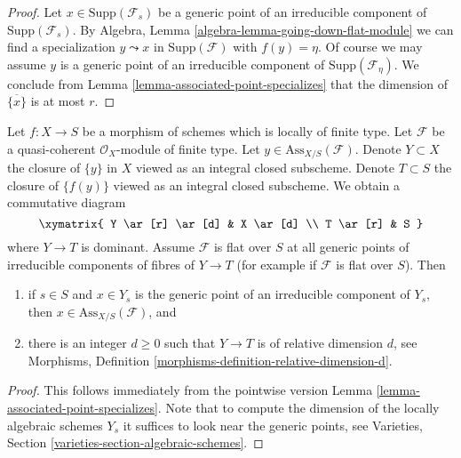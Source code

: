 \begin{proof}
Let $x \in \text{Supp}(\mathcal{F}_s)$ be a generic point of an irreducible
component of $\text{Supp}(\mathcal{F}_s)$. By
Algebra, Lemma \ref{algebra-lemma-going-down-flat-module}
we can find a specialization $y \leadsto x$ in $\text{Supp}(\mathcal{F})$
with $f(y) = \eta$. Of course we may assume $y$ is a generic point
of an irreducible component of $\text{Supp}(\mathcal{F}_\eta)$.
We conclude from Lemma \ref{lemma-associated-point-specializes}
that the dimension of $\overline{\{x\}}$ is at most $r$.
\end{proof}

\begin{lemma}
\label{lemma-flat-associated-equidimensional}
Let $f : X \to S$ be a morphism of schemes which is locally of finite type.
Let $\mathcal{F}$ be a quasi-coherent $\mathcal{O}_X$-module of finite type.
Let $y \in \text{Ass}_{X/S}(\mathcal{F})$.
Denote $Y \subset X$ the closure of $\{y\}$ in $X$ viewed
as an integral closed subscheme. Denote $T \subset S$ the closure
of $\{f(y)\}$ viewed as an integral closed subscheme. We obtain
a commutative diagram
$$
\xymatrix{
Y \ar[r] \ar[d] & X \ar[d] \\
T \ar[r] & S
}
$$
where $Y \to T$ is dominant. Assume $\mathcal{F}$ is flat over $S$
at all generic points of irreducible components of fibres of $Y \to T$
(for example if $\mathcal{F}$ is flat over $S$). Then
\begin{enumerate}
\item if $s \in S$ and $x \in Y_s$ is the generic point of an
irreducible component of $Y_s$, then $x \in \text{Ass}_{X/S}(\mathcal{F})$, and
\item there is an integer $d \geq 0$ such that
$Y \to T$ is of relative dimension $d$, see
Morphisms, Definition \ref{morphisms-definition-relative-dimension-d}.
\end{enumerate}
\end{lemma}

\begin{proof}
This follows immediately from the pointwise version
Lemma \ref{lemma-associated-point-specializes}.
Note that to compute the dimension of the locally
algebraic schemes $Y_s$ it suffices to look near
the generic points, see Varieties, Section
\ref{varieties-section-algebraic-schemes}.
\end{proof}


